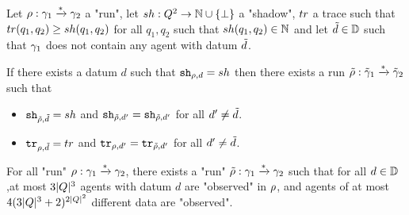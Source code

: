 \begin{lemma}
	\label{lem:data-copycat}
	Let  $\rho : \gamma_1 \xrightarrow{*} \gamma_2$ a "run", let $sh : Q^2 \to \mathbb{N} \cup \{\bot\}$ a "shadow", $tr$ a trace such that $tr(q_1, q_2) \geq sh(q_1, q_2)$ for all $q_1, q_2$ such that $sh(q_1, q_2) \in \mathbb{N}$ and let $\Tilde{d} \in \mathbb{D}$ such that $\gamma_1$ does not contain any agent with datum $\Tilde{d}$. 
	
	If there exists a datum $d$ such that $\mathtt{sh}_{\rho,d}=sh$ then there exists a run $\Tilde{\rho} : \Tilde{\gamma}_1 \xrightarrow{*} \Tilde{\gamma}_2$ such that
	\begin{itemize}
		\item $\mathtt{sh}_{\Tilde{\rho},\Tilde{d}} = sh$ and $\mathtt{sh}_{\Tilde{\rho},d'} = \mathtt{sh}_{\Tilde{\rho},d'}$ for all $d' \neq \Tilde{d}$.
		
		\item $\mathtt{tr}_{\rho,\Tilde{d}} = tr$ and $\mathtt{tr}_{\rho,d'} = \mathtt{tr}_{\Tilde{\rho},d'}$ for all $d' \neq \Tilde{d}$.
	\end{itemize}
\end{lemma}

\begin{corollary}
	\label{cor:run-few-observed-data-and-agents}
	For all "run" $\rho : \gamma_1 \xrightarrow{*} \gamma_2$, there exists a "run" $\Tilde{\rho} : \gamma_1 \xrightarrow{*} \gamma_2$ such that for all $d \in \mathbb{D}$,at most $3|Q|^3$ agents with datum $d$ are "observed" in $\rho$, and agents of at most $4(3|Q|^3+2)^{2|Q|^2}$ different data are "observed".
\end{corollary}


